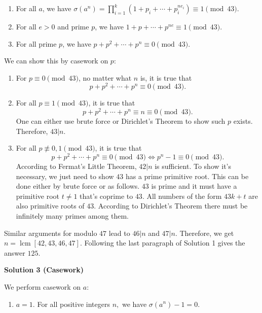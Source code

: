 \begin{enumerate}
 
            \begin{enumerate} 
        \item For all $a$, we have $\sigma(a^n)=\prod_{i=1}^k(1+p_i+\cdots+p_i^{ne_i})\equiv1\pmod{43}$.

        \item For all $e>0$ and prime $p$, we have $1+p+\cdots+p^{ne}\equiv1\pmod{43}$.

        \item For all prime $p$, we have $p+p^2+\cdots+p^n \equiv 0 \pmod{43}$.

            \end{enumerate}
            We can show this by casework on $p$:

 
            \begin{enumerate} 
        \item For $p\equiv0\pmod{43}$, no matter what $n$ is, it is true that 
 \[p+p^2+\cdots+p^n \equiv 0 \pmod{43}.\]

        \item For all $p\equiv1\pmod{43}$, it is true that 
 \[p+p^2+\cdots+p^n \equiv n \equiv 0 \pmod{43}.\] One can either use brute force or Dirichlet's Theorem to show such $p$ exists. Therefore, $43|n$.

        \item For all $p\not\equiv0,1\pmod{43}$, it is true that
 \[p+p^2+\cdots+p^n \equiv 0 \pmod{43} \Leftrightarrow p^n-1\equiv0\pmod{43}.\] According to Fermat's Little Theorem, $42|n$ is sufficient. To show it's necessary, we just need to show $43$ has a prime primitive root. This can be done either by brute force or as follows. $43$ is prime and it must have a primitive root $t\neq 1$ that's coprime to $43$. All numbers of the form $43k+t$ are also primitive roots of $43$. According to Dirichlet's Theorem there must be infinitely many primes among them.

            \end{enumerate}
            Similar arguments for modulo $47$ lead to $46|n$ and $47|n$. Therefore, we get $n=\operatorname{lcm}[42,43,46,47]$. Following the last paragraph of Solution 1 gives the answer $\boxed{125}$.

 



\textbf{Solution 3 (Casework)}

We perform casework on $a:$

            \begin{enumerate} 
        \item $a=1.$ For all positive integers $n,$ we have $\sigma\left(a^n\right)-1=0.$
 

\end{enumerate}
\end{enumerate}
